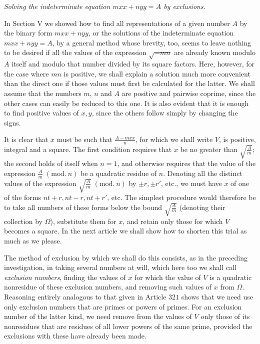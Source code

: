 \begin{center}\textit{Solving the indeterminate equation \(mxx+nyy=A\) by exclusions.}\end{center}


In Section V we showed how to find all representations of a given number \(A\) by the binary form \(mxx+nyy\),
or the solutions of the indeterminate equation \(mxx+nyy=A\), by a general method whose brevity, too, seems to leave nothing to be desired if all the values of the expression \(\surd{-mn}\) are already known modulo \(A\) itself and modulo that number divided by its square factors. Here, however, for the case where \(mn\) is positive, we shall explain a solution much more convenient than the direct one if those values must first be calculated for the latter. We shall assume that the numbers \(m\), \(n\) and \(A\) are positive and pairwise coprime, since the other cases can easily be reduced to this one. It is also evident that it is enough to find positive values of \(x,\allowbreak y\), since the others follow simply by changing the signs.

It is clear that \(x\) must be such that \(\frac{A-mxx}{n}\), for which we shall write \(V\), is positive, integral and a square. The first condition requires that \(x\) be no greater than \(\surd{\frac Am}\); the second holds of itself when \(n=1\), and otherwise requires that the value of the expression \(\frac Am\; (\mathrm{mod}.\ n)\) be a quadratic residue of \(n\). Denoting all the distinct values of the expression \(\surd{\frac Am}\; (\mathrm{mod}.\ n)\) by \(\pm r,\allowbreak \pm r'\), etc., we must have \(x\) of one of the forms \(nt+r,\allowbreak nt-r,\allowbreak nt+r'\), etc. The simplest procedure would therefore be to take all numbers of these forms below the bound \(\surd{\frac Am}\) (denoting their collection by \(\Omega\)), substitute them for \(x\), and retain only those for which \(V\) becomes a square. In the next article we shall show how to shorten this trial as much as we please.

The method of exclusion by which we shall do this consists, as in the preceding investigation, in taking several numbers at will, which here too we shall call \textit{exclusion numbers}, finding the values of \(x\) for which the value of \(V\) is a quadratic nonresidue of these exclusion numbers, and removing such values of \(x\) from \(\Omega\). Reasoning entirely analogous to that given in Article \(321\) shows that we need use only exclusion numbers that are primes or powers of primes. For an exclusion number of the latter kind, we need remove from the values of \(V\) only those of its nonresidues that are residues of all lower powers of the same prime, provided the exclusions with these have already been made.

